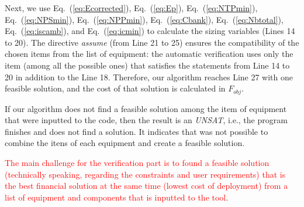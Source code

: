 \documentclass[10pt,conference]{IEEEtran}
\begin{document}
Next, we use Eq.~(\ref{eq:Ecorrected}), Eq.~(\ref{eq:Ep}), Eq.~(\ref{eq:NTPmin}), Eq.~(\ref{eq:NPSmin}), Eq.~(\ref{eq:NPPmin}), Eq.~(\ref{eq:Cbank}), Eq.~(\ref{eq:Nbtotal}), Eq.~(\ref{eq:iscamb}), and Eq.~(\ref{eq:icmin}) to calculate the sizing variables (Lines 14 to 20). The directive \textit{assume} (from Line 21 to 25) ensures the compatibility of the chosen items from the list of equipment: the automatic verification uses only the item (among all the possible ones) that satisfies the statements from Line 14 to 20 in addition to the Line 18. Therefore, our algorithm reaches Line 27 with one feasible solution, and the cost of that solution is calculated in $F_{obj}$.

If our algorithm does not find a feasible solution among the item of equipment that were inputted to the code, then the result is an \textit{UNSAT}, i.e., the program finishes and does not find a solution. It indicates that was not possible to combine the itens of each equipment and create a feasible solution.

\textcolor{red}{The main challenge for the verification part is to found a feasible solution (technically speaking, regarding the constraints and user requirements) that is the best financial solution at the same time (lowest cost of deployment) from a list of equipment and components that is inputted to the tool}.
\end{document}
